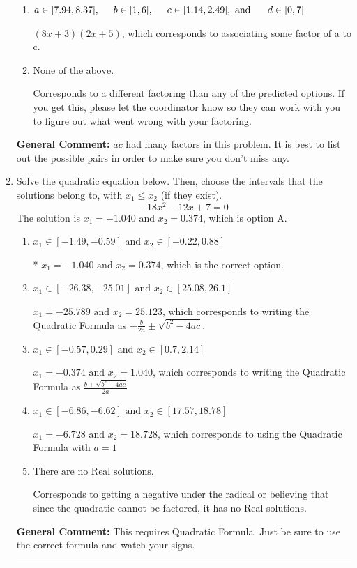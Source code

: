 \documentclass{extbook}[14pt]
\newcommand{\litem}[1]{\item #1

\rule{\textwidth}{0.4pt}}
\begin{document}
\begin{enumerate}
{\begin{enumerate}[label=\Alph*.]
 $(x + 12)(x + 20)$, which corresponds to factoring $x^{2} +32 x + 240$.
\item \( a \in [7.94, 8.37], \hspace*{5mm} b \in [1, 6], \hspace*{5mm} c \in [1.14, 2.49], \text{ and } \hspace*{5mm} d \in [0, 7] \)

 $(8x + 3)(2x + 5)$, which corresponds to associating some factor of a to c.
\item \( \text{None of the above.} \)

 Corresponds to a different factoring than any of the predicted options. If you get this, please let the coordinator know so they can work with you to figure out what went wrong with your factoring.
\end{enumerate}

\textbf{General Comment:} $ac$ had many factors in this problem. It is best to list out the possible pairs in order to make sure you don't miss any.
}
\litem{
Solve the quadratic equation below. Then, choose the intervals that the solutions belong to, with $x_1 \leq x_2$ (if they exist).
\[ -18x^{2} -12 x + 7 = 0 \]The solution is \( x_1 = -1.040 \text{ and } x_2 = 0.374 \), which is option A.\begin{enumerate}[label=\Alph*.]
\item \( x_1 \in [-1.49, -0.59] \text{ and } x_2 \in [-0.22, 0.88] \)

* $x_1 = -1.040 \text{ and } x_2 = 0.374$, which is the correct option.
\item \( x_1 \in [-26.38, -25.01] \text{ and } x_2 \in [25.08, 26.1] \)

 $x_1 = -25.789 \text{ and } x_2 = 25.123$, which corresponds to writing the Quadratic Formula as $-\frac{b}{2a} \pm \sqrt{b^2 - 4ac}$.
\item \( x_1 \in [-0.57, 0.29] \text{ and } x_2 \in [0.7, 2.14] \)

 $x_1 = -0.374 \text{ and } x_2 = 1.040$, which corresponds to writing the Quadratic Formula as $\frac{b \pm \sqrt{b^2 - 4ac}}{2a}$
\item \( x_1 \in [-6.86, -6.62] \text{ and } x_2 \in [17.57, 18.78] \)

 $x_1 = -6.728 \text{ and } x_2 = 18.728$, which corresponds to using the Quadratic Formula with $a=1$
\item \( \text{There are no Real solutions.} \)

Corresponds to getting a negative under the radical or believing that since the quadratic cannot be factored, it has no Real solutions.
\end{enumerate}

\textbf{General Comment:} This requires Quadratic Formula. Just be sure to use the correct formula and watch your signs.
}
\end{enumerate}
\end{document}
